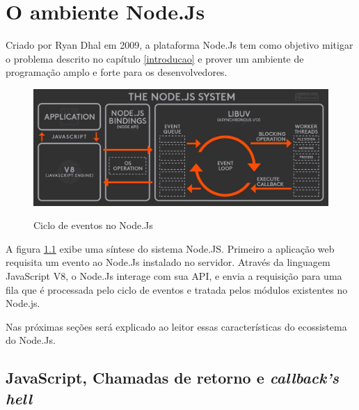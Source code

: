 \chapter{O ambiente Node.Js}
\label{ambiente-node-js}



  Criado por Ryan Dhal em 2009, a plataforma Node.Js tem como objetivo mitigar o problema descrito no capítulo \ref{introducao}
  e prover um ambiente de programação amplo e forte para os desenvolvedores. \cite{hughes}
  
    \begin{figure}[H]
    \setlength{\abovecaptionskip}{0pt}
    \setlength{\belowcaptionskip}{0pt}
    \caption[Ciclo de eventos no Node.Js]{Ciclo de eventos no Node.Js}
    \centering
    \includegraphics[width=.85\textwidth]{imagem/node-js-system-twitter-BusyRich.png}
    \captionsetup{justification=centering}
    \label{fig:node-js-system-loop}
  \end{figure}
  
  A figura \ref{fig:node-js-system-loop} exibe uma síntese do sistema Node.JS. Primeiro a aplicação web requisita um evento 
  ao Node.Js instalado no servidor. Através da linguagem JavaScript V8, o Node.Js interage com sua \ac{API}, e envia 
  a requisição para uma fila que é processada pelo ciclo de eventos e tratada pelos módulos existentes no Node.js. 
  
  Nas próximas seções será explicado ao leitor essas características do ecossistema do Node.Js.
 
\section{JavaScript, Chamadas de retorno e \textit{callback's hell}}
\label{chamadas-de-retorno-e-callback-hell}

